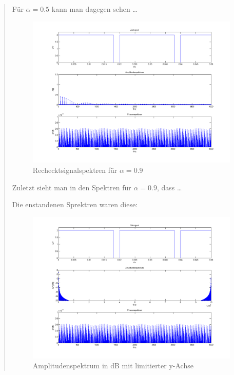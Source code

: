 \begin{quote}
		Für $\alpha = 0.5$ kann man dagegen sehen \ldots
		
		
		\begin{center}
	           \begin{figure}[H]
    			\centering
    				\includegraphics[scale=0.5]{recht_alpha9.png}
    			\caption{Rechecktsignalspektren für $\alpha = 0.9$}		
    			\end{figure}
		\end{center}
		
		Zuletzt sieht man in den Spektren für $\alpha = 0.9$, dass \ldots
		
		\vspace{1em}
		
		

		Die enstandenen Sprektren waren diese:
		
	           \begin{figure}[H]
    			\centering
    				\includegraphics[scale=0.5]{Ampl[dB].png}
    			\caption{Amplitudenspektrum in dB mit limitierter y-Achse}
    			\end{figure}		
		

\end{quote}
